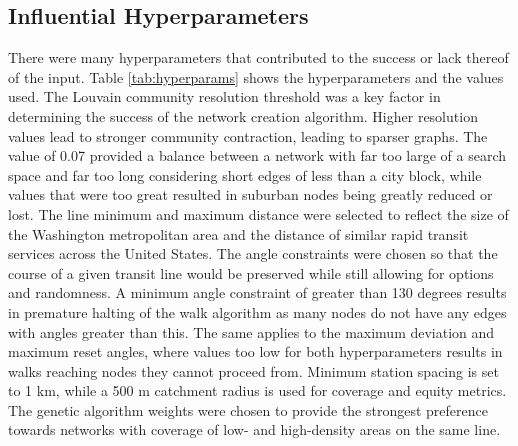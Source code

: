 \documentclass[sigconf,nonacm]{acmart}
\begin{document}
\subsection{Influential Hyperparameters}
There were many hyperparameters that contributed to the success or lack thereof of the input. Table \ref{tab:hyperparams} shows the hyperparameters and the values used. The Louvain community resolution threshold was a key factor in determining the success of the network creation algorithm. Higher resolution values lead to stronger community contraction, leading to sparser graphs. The value of 0.07 provided a balance between a network with far too large of a search space and far too long considering short edges of less than a city block, while values that were too great resulted in suburban nodes being greatly reduced or lost. The line minimum and maximum distance were selected to reflect the size of the Washington metropolitan area and the distance of similar rapid transit services across the United States. The angle constraints were chosen so that the course of a given transit line would be preserved while still allowing for options and randomness. A minimum angle constraint of greater than 130 degrees results in premature halting of the walk algorithm as many nodes do not have any edges with angles greater than this. The same applies to the maximum deviation and maximum reset angles, where values too low for both hyperparameters results in walks reaching nodes they cannot proceed from. Minimum station spacing is set to 1 km, while a 500 m catchment radius is used for coverage and equity metrics. The genetic algorithm weights were chosen to provide the strongest preference towards networks with coverage of low- and high-density areas on the same line. 
\end{document}
